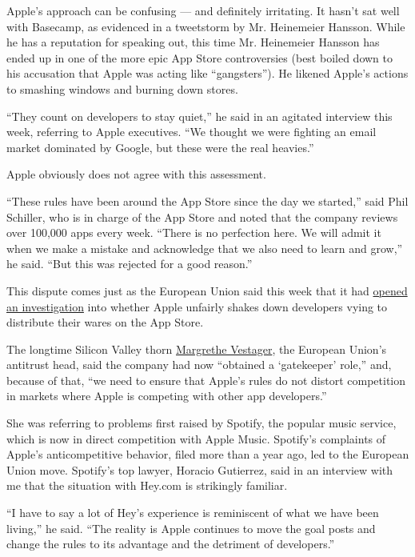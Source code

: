 Apple's approach can be confusing --- and definitely irritating. It
hasn't sat well with Basecamp, as evidenced in a tweetstorm by Mr.
Heinemeier Hansson. While he has a reputation for speaking out, this
time Mr. Heinemeier Hansson has ended up in one of the more epic App
Store controversies (best boiled down to his accusation that Apple was
acting like ``gangsters''). He likened Apple's actions to smashing
windows and burning down stores.

``They count on developers to stay quiet,'' he said in an agitated
interview this week, referring to Apple executives. ``We thought we were
fighting an email market dominated by Google, but these were the real
heavies.''

Apple obviously does not agree with this assessment.

``These rules have been around the App Store since the day we started,''
said Phil Schiller, who is in charge of the App Store and noted that the
company reviews over 100,000 apps every week. ``There is no perfection
here. We will admit it when we make a mistake and acknowledge that we
also need to learn and grow,'' he said. ``But this was rejected for a
good reason.''

This dispute comes just as the European Union said this week that it had
\href{https://www.nytimes3xbfgragh.onion/2020/06/16/business/apple-app-store-european-union-antitrust.html}{opened
an investigation} into whether Apple unfairly shakes down developers
vying to distribute their wares on the App Store.

The longtime Silicon Valley thorn
\href{https://www.nytimes3xbfgragh.onion/2019/11/19/technology/tech-regulator-europe.html}{Margrethe
Vestager}, the European Union's antitrust head, said the company had now
``obtained a `gatekeeper' role,'' and, because of that, ``we need to
ensure that Apple's rules do not distort competition in markets where
Apple is competing with other app developers.''

She was referring to problems first raised by Spotify, the popular music
service, which is now in direct competition with Apple Music. Spotify's
complaints of Apple's anticompetitive behavior, filed more than a year
ago, led to the European Union move. Spotify's top lawyer, Horacio
Gutierrez, said in an interview with me that the situation with Hey.com
is strikingly familiar.

``I have to say a lot of Hey's experience is reminiscent of what we have
been living,'' he said. ``The reality is Apple continues to move the
goal posts and change the rules to its advantage and the detriment of
developers.''


